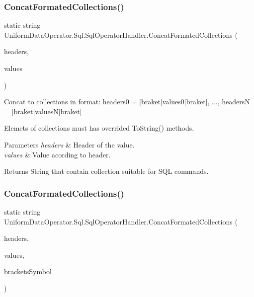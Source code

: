 \subsubsection{\texorpdfstring{Concat\+Formated\+Collections()}{ConcatFormatedCollections()}\hspace{0.1cm}{\footnotesize\ttfamily [1/2]}}
{\footnotesize\ttfamily static string Uniform\+Data\+Operator.\+Sql.\+Sql\+Operator\+Handler.\+Concat\+Formated\+Collections (\begin{DoxyParamCaption}\item[{I\+Enumerable$<$ object $>$}]{headers,  }\item[{I\+Enumerable$<$ object $>$}]{values }\end{DoxyParamCaption})\hspace{0.3cm}{\ttfamily [static]}}



Concat to collections in format\+: headers0 = \mbox{[}braket\mbox{]}values0\mbox{[}braket\mbox{]}, ..., headersN = \mbox{[}braket\mbox{]}valuesN\mbox{[}braket\mbox{]} 

Elemets of collections must has overrided To\+String() methods. 


\begin{DoxyParams}{Parameters}
{\em headers} & Header of the value.\\
\hline
{\em values} & Value acording to header.\\
\hline
\end{DoxyParams}
\begin{DoxyReturn}{Returns}
String that contain collection suitable for S\+QL commands.
\end{DoxyReturn}
\mbox{\label{class_uniform_data_operator_1_1_sql_1_1_sql_operator_handler_ac17e36b29fe5a17281927ab04dbeab26}} 
\subsubsection{\texorpdfstring{Concat\+Formated\+Collections()}{ConcatFormatedCollections()}\hspace{0.1cm}{\footnotesize\ttfamily [2/2]}}
{\footnotesize\ttfamily static string Uniform\+Data\+Operator.\+Sql.\+Sql\+Operator\+Handler.\+Concat\+Formated\+Collections (\begin{DoxyParamCaption}\item[{I\+Enumerable$<$ object $>$}]{headers,  }\item[{I\+Enumerable$<$ object $>$}]{values,  }\item[{char}]{brackets\+Symbol }\end{DoxyParamCaption})\hspace{0.3cm}{\ttfamily [static]}}



